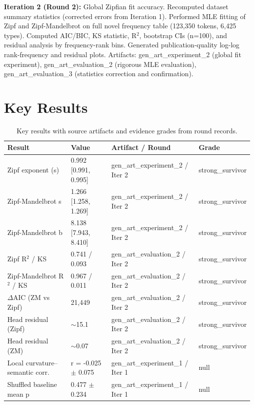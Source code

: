 \documentclass[11pt,letterpaper]{article}
\begin{document}
\textbf{Iteration 2 (Round 2):} Global Zipfian fit accuracy. Recomputed dataset summary statistics (corrected errors from Iteration 1). Performed MLE fitting of Zipf and Zipf-Mandelbrot on full novel frequency table (123,350 tokens, 6,425 types). Computed AIC/BIC, KS statistic, R$^2$, bootstrap CIs (n=100), and residual analysis by frequency-rank bins. Generated publication-quality log-log rank-frequency and residual plots. Artifacts: gen\_art\_experiment\_2 (global fit experiment), gen\_art\_evaluation\_2 (rigorous MLE evaluation), gen\_art\_evaluation\_3 (statistics correction and confirmation).

\section{Key Results}

\begin{table}[!htbp]
\centering
\caption{Key results with source artifacts and evidence grades from round records.}
\label{tab:key_results}
\begin{tabular}{llll}
\toprule
Result & Value & Artifact / Round & Grade \\
\midrule
Zipf exponent (s) & 0.992 [0.991, 0.995] & gen\_art\_experiment\_2 / Iter 2 & strong\_survivor \\
Zipf-Mandelbrot s & 1.266 [1.258, 1.269] & gen\_art\_experiment\_2 / Iter 2 & strong\_survivor \\
Zipf-Mandelbrot b & 8.138 [7.943, 8.410] & gen\_art\_experiment\_2 / Iter 2 & strong\_survivor \\
Zipf R$^2$ / KS & 0.741 / 0.093 & gen\_art\_evaluation\_2 / Iter 2 & strong\_survivor \\
Zipf-Mandelbrot R$^2$ / KS & 0.967 / 0.011 & gen\_art\_evaluation\_2 / Iter 2 & strong\_survivor \\
$\Delta$AIC (ZM vs Zipf) & 21,449 & gen\_art\_evaluation\_2 / Iter 2 & strong\_survivor \\
Head residual (Zipf) & $\sim$15.1 & gen\_art\_evaluation\_2 / Iter 2 & strong\_survivor \\
Head residual (ZM) & $\sim$0.07 & gen\_art\_evaluation\_2 / Iter 2 & strong\_survivor \\
Local curvature--semantic corr. & r = -0.025 $\pm$ 0.075 & gen\_art\_experiment\_1 / Iter 1 & null \\
Shuffled baseline mean p & 0.477 $\pm$ 0.234 & gen\_art\_experiment\_1 / Iter 1 & null \\
\bottomrule
\end{tabular}
\end{table}
\end{document}
